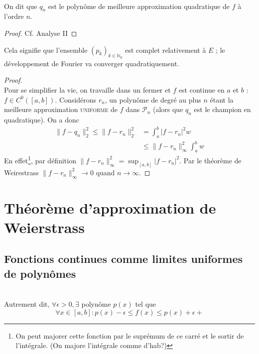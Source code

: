 	
\ \\
On dit que $q_n$ est le polynôme de meilleure approximation quadratique de 
$f$ à l'ordre $n$.
\begin{proof}
	Cf. Analyse II
\end{proof}
	
\theor{\ \\
	Si $]a, b[$ est \textbf{borné} (!), alors $\forall f \in E : \lim\limits_{n
		\rightarrow	\infty} \| f - q_n \|_2 = 0$}
Cela signifie que l'ensemble $(p_k)_{k\in\mathbb{N}_0}$ est complet 
relativement à $E$ ; le développement de Fourier va converger quadratiquement.
	
\begin{proof}\ \\
	Pour se simplifier la vie, on travaille dans un fermer et $f$ est continue en 
	$a$ et $b$ : $f \in C^0([a,b])$. Considérons $r_n$, un polynôme de degré au 
	plus $n$ étant la meilleure approximation \textsc{uniforme} de $f$ dans 
	$\mathcal{P}_n$ (alors que $q_n$ est le champion en quadratique). On a donc
	\begin{equation}
		\begin{array}{ll}
			\|f - q_n\|_2^2 \leq \|f-r_n\|_2^2 & = \int_a^b |f-r_n|^2w              \\
			                                   & \leq \| f-r_n\|_\infty^2\int_a^b w 
		\end{array}
	\end{equation}
	En effet\footnote{On peut majorer cette fonction par le suprémum de ce carré 
	et le sortir de l’intégrale. (On majore l'intégrale comme d'hab?)}, par 
	définition $\|f-r_n\|_\infty^2 = \sup_{[a,b]} |f-r_n|^2$. Par le théorème de 
	Weirestrass $\| f - r_n\|_\infty^2 \rightarrow 0$ quand $n \rightarrow\infty$.
\end{proof}
	



\section{Théorème d'approximation de Weierstrass}
\subsection{Fonctions continues comme limites uniformes de polynômes}
\ \\
Autrement dit, $\forall \epsilon > 0, \exists$ polynôme $p(x)$ tel que 
\begin{equation}
	\forall x \in [a,b] : p(x) - \epsilon \leq f(x) \leq p(x)+\epsilon
	+
\end{equation}
	
